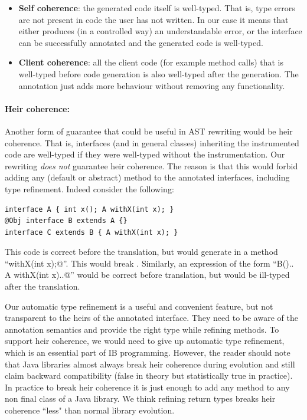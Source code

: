 \begin{itemize}

\item{\bf Self coherence}: the generated code itself is well-typed. That is,
  type errors are not present in code the user has not written.
In our case it means that either \mixin{} produces (in a controlled way) an
understandable error, or the interface can be successfully annotated and the generated code is well-typed.

\item{\bf Client coherence}: all the client code (for example method calls)
  that is well-typed before code generation is also well-typed after the generation.
The annotation just adds more behaviour without removing any functionality.

\end{itemize}

\paragraph{Heir coherence:} Another form of guarantee that could be
useful in AST rewriting would be heir coherence. That is, interfaces
(and in general classes) inheriting the instrumented code are
well-typed if they were well-typed without the instrumentation.
Our rewriting \emph{does not} guarantee heir coherence.  The reason
is that this would forbid adding any (default or abstract) method to
the annotated interfaces, including type refinement. Indeed consider
the following:

\begin{lstlisting}
interface A { int x(); A withX(int x); }
@Obj interface B extends A {}
interface C extends B { A withX(int x); }
\end{lstlisting}

\noindent This code is correct before the translation, but \mixin would  generate in \Q@B@  a method ``\Q@B withX(int x);@''.
This would break \Q@C@.
Similarly, an expression of the form ``\Q@new B(){.. A withX(int x){..}}@''
would be correct before translation, but would be ill-typed after the translation.

Our automatic type refinement is a useful and convenient feature, but
not transparent to the heirs of the annotated interface.  They need to
be aware of the annotation semantics and provide the right type while
refining methods. To support heir coherence, we would need
to give up automatic type refinement, which is an essential part of IB programming.
However, the reader should note that Java libraries almost always break heir
coherence during evolution and still claim backward compatibility (false in
theory but statistically true in practice). In practice to break heir
coherence it is just enough to add any method to any
non final class of a Java library.  We think refining return
types breaks heir coherence ``less" than normal library evolution.

